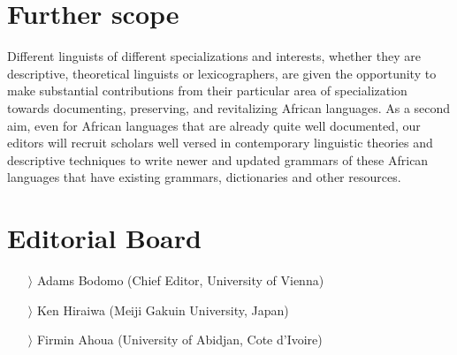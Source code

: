 \documentclass[
notumble,
nofoldmark,
]{leaflet}
\begin{document}
 
{
    \section{Further scope}    

Different linguists of different specializations and interests, whether they are descriptive, theoretical linguists or lexicographers, are given the opportunity to make substantial contributions from their particular area of specialization towards documenting, preserving, and revitalizing African languages. 
As a second aim, even for African languages that are already quite well documented, our editors will recruit scholars well versed in contemporary linguistic theories and descriptive techniques to write newer and updated grammars of these African languages that have existing grammars, dictionaries and other resources.

    \section{Editorial Board}    
\raggedright
    \begin{itemize}
    \item[$\rangle$] Adams Bodomo (Chief Editor, University of Vienna)
    \item[$\rangle$]Ken Hiraiwa (Meiji Gakuin University, Japan)
    \item[$\rangle$]Firmin Ahoua (University of Abidjan, Cote d'Ivoire)
    \end{itemize}
     }
 
\end{document}
